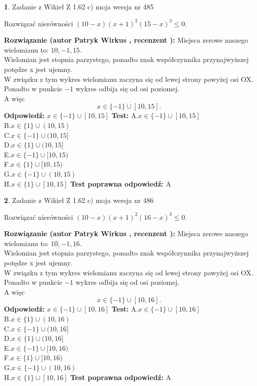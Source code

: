 \documentclass[12pt, a4paper]{article}
\theoremstyle{definition} %
\newtheorem{zad}{}
\newcommand{\zadStart}[1]{\begin{zad}#1\newline}
\newcommand{\zadStop}{\end{zad}}
\newcommand{\rozwStart}[2]{\noindent \textbf{Rozwiązanie (autor #1 , recenzent #2): }\newline}
\newcommand{\rozwStop}{\newline}
\newcommand{\odpStart}{\noindent \textbf{Odpowiedź:}\newline}
\newcommand{\odpStop}{\newline}
\newcommand{\testStart}{\noindent \textbf{Test:}\newline}
\newcommand{\testStop}{\newline}
\newcommand{\kluczStart}{\noindent \textbf{Test poprawna odpowiedź:}\newline}
\newcommand{\kluczStop}{\newline}
\begin{document}
\zadStart{Zadanie z Wikieł Z 1.62 c) moja wersja nr 485}

Rozwiązać nierówności $(10-x)(x+1)^{2}(15-x)^{3}\le0$.
\zadStop
\rozwStart{Patryk Wirkus}{}
Miejsca zerowe naszego wielomianu to: $10, -1, 15$.\\
Wielomian jest stopnia parzystego, ponadto znak współczynnika przy\linebreak najwyższej potędze x jest ujemny.\\ W związku z tym wykres wielomianu zaczyna się od lewej strony powyżej osi OX.\\
Ponadto w punkcie $-1$ wykres odbija się od osi poziomej.\\
A więc $$x \in \{-1\} \cup [10,15].$$
\rozwStop
\odpStart
$x \in \{-1\} \cup [10,15]$
\odpStop
\testStart
A.$x \in \{-1\} \cup [10,15]$\\
B.$x \in \{1\} \cup (10,15)$\\
C.$x \in \{-1\} \cup (10,15]$\\
D.$x \in \{1\} \cup (10,15]$\\
E.$x \in \{-1\} \cup [10,15)$\\
F.$x \in \{1\} \cup [10,15)$\\
G.$x \in \{-1\} \cup (10,15)$\\
H.$x \in \{1\} \cup [10,15]$
\testStop
\kluczStart
A
\kluczStop



\zadStart{Zadanie z Wikieł Z 1.62 c) moja wersja nr 486}

Rozwiązać nierówności $(10-x)(x+1)^{2}(16-x)^{3}\le0$.
\zadStop
\rozwStart{Patryk Wirkus}{}
Miejsca zerowe naszego wielomianu to: $10, -1, 16$.\\
Wielomian jest stopnia parzystego, ponadto znak współczynnika przy\linebreak najwyższej potędze x jest ujemny.\\ W związku z tym wykres wielomianu zaczyna się od lewej strony powyżej osi OX.\\
Ponadto w punkcie $-1$ wykres odbija się od osi poziomej.\\
A więc $$x \in \{-1\} \cup [10,16].$$
\rozwStop
\odpStart
$x \in \{-1\} \cup [10,16]$
\odpStop
\testStart
A.$x \in \{-1\} \cup [10,16]$\\
B.$x \in \{1\} \cup (10,16)$\\
C.$x \in \{-1\} \cup (10,16]$\\
D.$x \in \{1\} \cup (10,16]$\\
E.$x \in \{-1\} \cup [10,16)$\\
F.$x \in \{1\} \cup [10,16)$\\
G.$x \in \{-1\} \cup (10,16)$\\
H.$x \in \{1\} \cup [10,16]$
\testStop
\kluczStart
A
\kluczStop
\end{document}

